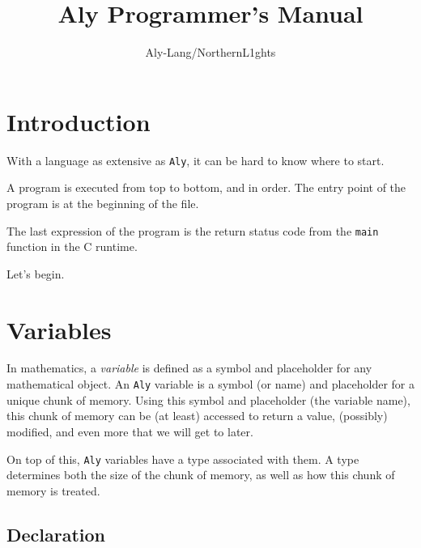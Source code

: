 \documentclass[12pt]{report}
\title  {Aly Programmer's Manual}
\author {Aly-Lang/NorthernL1ghts}
\begin{document}
\pagestyle{fancy}
\renewcommand{\chaptermark}[1]{\markboth{#1}{#1}}
\fancyhf{}
\fancyhead[C]{\leftmark}
\fancyfoot[C]{\thepage}

\hypersetup{pageanchor=false}
\begin{titlepage}
  \maketitle
\end{titlepage}

\chapter{Introduction}
\label{sec:intro}

With a language as extensive as \verb|Aly|, it can be hard to know where to start.

A program is executed from top to bottom, and in order. The entry point of the program is at the beginning of the file.

The last expression of the program is the return status code from the \verb|main| function in the C runtime.

Let's begin.

\chapter{Variables}
\label{chpt:vars}

In mathematics, a \emph{variable} is defined as a symbol and placeholder for any mathematical object. An \verb|Aly| variable is a symbol (or name) and placeholder for a unique chunk of memory. Using this symbol and placeholder (the variable name), this chunk of memory can be (at least) accessed to return a value, (possibly) modified, and even more that we will get to later.

On top of this, \verb|Aly| variables have a type associated with them. A type determines both the size of the chunk of memory, as well as how this chunk of memory is treated.

\section*{Declaration}
\label{subsec:variables-declaration}
\end{document}
